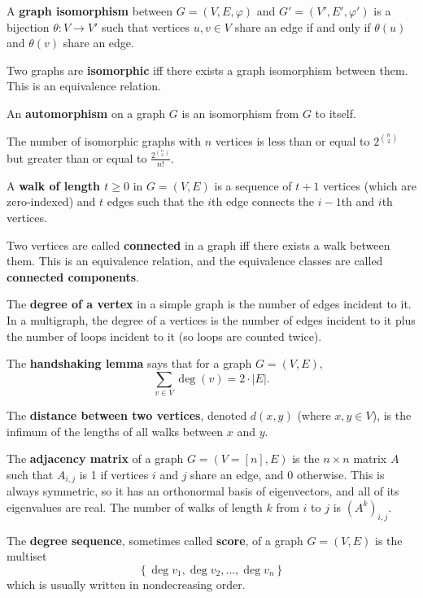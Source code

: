 \documentclass[12pt]{article}
\begin{document}
\par
A \textbf{graph isomorphism} between $G=(V,E,\varphi)$ and $G'=(V',E',\varphi')$ is a bijection $\theta: V \rightarrow V'$ such that vertices $u,v \in V$ share an edge if and only if $\theta(u)$ and $\theta(v)$ share an edge.
\par
Two graphs are \textbf{isomorphic} iff there exists a graph isomorphism between them. This is an equivalence relation.
\par
An \textbf{automorphism} on a graph $G$ is an isomorphism from $G$ to itself.
\par
The number of isomorphic graphs with $n$ vertices is less than or equal to $2^{\binom{n}{2}}$ but greater than or equal to $\frac{2^{\binom{n}{2}}}{n!}$.
\par
A \textbf{walk of length $t\geq0$} in $G=(V,E)$ is a sequence of $t+1$ vertices (which are zero-indexed) and $t$ edges such that the $i$th edge connects the $i-1$th and $i$th vertices.
\par
Two vertices are called \textbf{connected} in a graph iff there exists a walk between them. This is an equivalence relation, and the equivalence classes are called \textbf{connected components}.
\par
The \textbf{degree of a vertex} in a simple graph is the number of edges incident to it. In a multigraph, the degree of a vertices is the number of edges incident to it plus the number of loops incident to it (so loops are counted twice).
\par
The \textbf{handshaking lemma} says that for a graph $G=(V,E)$,
\[ \sum_{v \in V} \operatorname{deg}(v) = 2 \cdot |E|. \]
\par
The \textbf{distance between two vertices}, denoted $d(x,y)$ (where $x,y \in V$), is the infimum of the lengths of all walks between $x$ and $y$.
\par
The \textbf{adjacency matrix} of a graph $G=(V=[n],E)$ is the $n\times n$ matrix $A$ such that $A_{i,j}$ is 1 if vertices $i$ and $j$ share an edge, and 0 otherwise. This is always symmetric, so it has an orthonormal basis of eigenvectors, and all of its eigenvalues are real. The number of walks of length $k$ from $i$ to $j$ is $\left( A^k \right)_{i,j}$.
\par
The \textbf{degree sequence}, sometimes called \textbf{score}, of a graph $G=(V,E)$ is the multiset
\[ \left\{ \operatorname{deg}v_1, \operatorname{deg}v_2, \dots, \operatorname{deg}v_n \right\} \]
which is usually written in nondecreasing order.
\par
\end{document}
